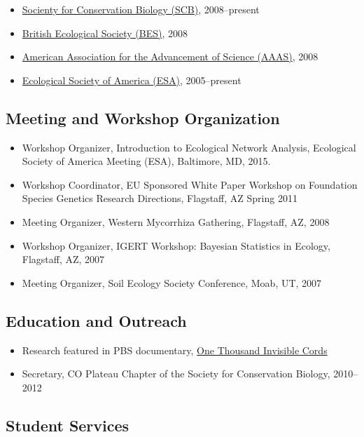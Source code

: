 \documentclass[a4paper]{article}
\begin{document}
\begin{itemize}
\item
  \href{http://www.conbio.org/}{Socienty for Conservation Biology
  (SCB)}, 2008--present
\item
  \href{http://www.aaas.org/}{British Ecological Society (BES)}, 2008
\item
  \href{http://www.aaas.org/}{American Association for the Advancement
  of Science (AAAS)}, 2008
\item
  \href{http://www.esa.org/}{Ecological Society of America (ESA)},
  2005--present
\end{itemize}

\subsection{Meeting and Workshop
Organization}\label{meeting-and-workshop-organization}

\begin{itemize}
\item 
  Workshop Organizer, Introduction to Ecological Network Analysis,
  Ecological Society of America Meeting (ESA), Baltimore, MD, 2015.
\item
  Workshop Coordinator, EU Sponsored White Paper Workshop on Foundation
  Species Genetics Research Directions, Flagstaff, AZ Spring 2011
\item
  Meeting Organizer, Western Mycorrhiza Gathering, Flagstaff, AZ, 2008
\item
  Workshop Organizer, IGERT Workshop: Bayesian Statistics in Ecology,
  Flagstaff, AZ, 2007
\item
  Meeting Organizer, Soil Ecology Society Conference, Moab, UT, 2007
\end{itemize}

\subsection{Education and Outreach}\label{education-and-outreach}

\begin{itemize}
\item
  Research featured in PBS documentary,
  \href{http://nau.edu/Research/Feature-Stories/A-Thousand-Invisible-Cords/}{One
  Thousand Invisible Cords}
\item
  Secretary, CO Plateau Chapter of the Society for Conservation Biology,
  2010--2012
\end{itemize}

\subsection{Student Services}\label{student-services}
\end{document}
